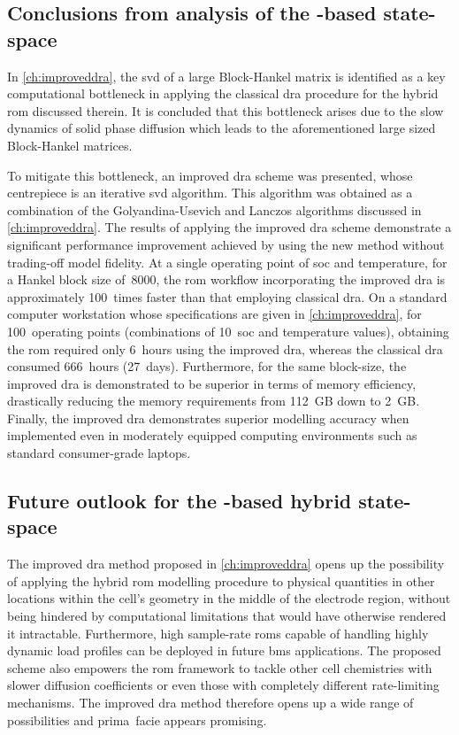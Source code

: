 \subsection{Conclusions from analysis of the -based state-space }

In  \cref{ch:improveddra},  the \gls{svd}  of  a  large Block-Hankel  matrix  is
identified as a key computational bottleneck in applying the classical \gls{dra}
procedure for the hybrid \gls{rom} discussed  therein. It is concluded that this
bottleneck arises due to the slow  dynamics of solid phase diffusion which leads
to the aforementioned large sized Block-Hankel matrices.

To mitigate this  bottleneck, an improved \gls{dra} scheme  was presented, whose
centrepiece is an iterative \gls{svd}  algorithm. This algorithm was obtained as
a  combination of  the Golyandina-Usevich  and Lanczos  algorithms discussed  in
\cref{ch:improveddra}.  The results  of applying  the improved  \gls{dra} scheme
demonstrate  a significant  performance improvement  achieved by  using the  new
method  without trading-off  model  fidelity.  At a  single  operating point  of
\gls{soc}  and temperature,  for  a  Hankel block  size  of~8000, the  \gls{rom}
workflow incorporating the improved  \gls{dra} is approximately 100~times faster
than  that employing  classical \gls{dra}.  On a  standard computer  workstation
whose  specifications  are  given in  \cref{ch:improveddra},  for  100~operating
points  (combinations of  10~\gls{soc}  and temperature  values), obtaining  the
\gls{rom}  required  only 6~hours  using  the  improved \gls{dra},  whereas  the
classical  \gls{dra} consumed  666~hours  (27~days). Furthermore,  for the  same
block-size, the  improved \gls{dra} is demonstrated  to be superior in  terms of
memory efficiency, drastically reducing the memory requirements from 112~GB down
to  2~GB.  Finally,  the  improved  \gls{dra}  demonstrates  superior  modelling
accuracy  when implemented  even in  moderately equipped  computing environments
such as standard consumer-grade laptops.

\subsection{Future outlook for the -based hybrid state-space }

The improved  \gls{dra} method  proposed in  \cref{ch:improveddra} opens  up the
possibility of  applying the  hybrid \gls{rom}  modelling procedure  to physical
quantities in other locations within the  cell's geometry \eg{} in the middle of
the electrode region,  without being hindered by  computational limitations that
would  have otherwise  rendered  it intractable.  Furthermore, high  sample-rate
\glspl{rom} capable  of handling  highly dynamic load  profiles can  be deployed
in  future  \gls{bms}  applications.  The  proposed  scheme  also  empowers  the
\gls{rom}  framework to  tackle  other cell  chemistries  with slower  diffusion
coefficients or  even those with completely  different rate-limiting mechanisms.
The improved \gls{dra}  method therefore opens up a wide  range of possibilities
and  prima~facie appears promising.

